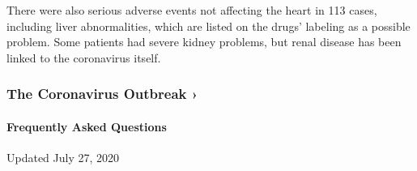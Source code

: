 There were also serious adverse events not affecting the heart in 113
cases, including liver abnormalities, which are listed on the drugs'
labeling as a possible problem. Some patients had severe kidney
problems, but renal disease has been linked to the coronavirus itself.

\href{https://www.nytimes.com/news-event/coronavirus?action=click\&pgtype=Article\&state=default\&region=MAIN_CONTENT_3\&context=storylines_faq}{}

\hypertarget{the-coronavirus-outbreak-}{%
\subsubsection{The Coronavirus Outbreak
›}\label{the-coronavirus-outbreak-}}

\hypertarget{frequently-asked-questions}{%
\paragraph{Frequently Asked
Questions}\label{frequently-asked-questions}}

Updated July 27, 2020

